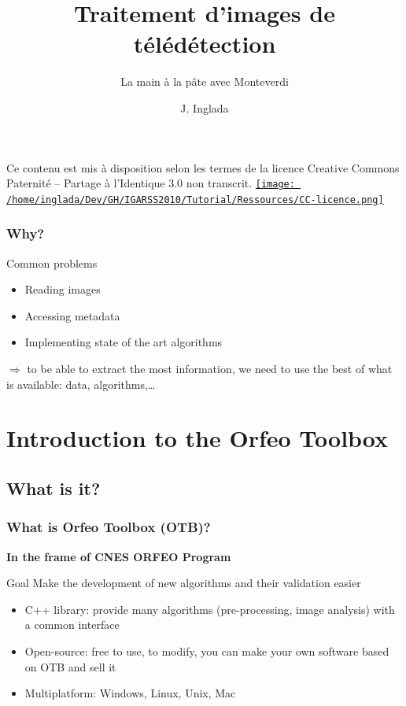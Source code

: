 \documentclass[compress]{beamer}
\title{Traitement d'images de télédétection}
\subtitle{La main à la pâte avec Monteverdi} %
\author
{J. Inglada}
\institute[Cesbio] %
{\textsc{Centre d'Études Spatiales de la Biosphère, Toulouse, France}}
\date{}
\begin{document}
\begin{frame}
  \titlepage
{\tiny Ce contenu est mis à disposition selon les termes de la licence
Creative Commons Paternité – Partage à l’Identique 3.0 non transcrit.} \href{http://creativecommons.org/licenses/by-sa/3.0/}{\texttt{[image: /home/inglada/Dev/GH/IGARSS2010/Tutorial/Ressources/CC-licence.png]}}
\end{frame}

\begin{frame}
\frametitle{Why?}
\begin{block}{Common problems}
\begin{itemize}
 \item Reading images
 \item Accessing metadata
 \item Implementing state of the art algorithms
\end{itemize}
\end{block}
$\Rightarrow$ to be able to \alert{extract the most information}, we
 need to \alert{use the best} of what is available: data, algorithms,\ldots
\end{frame}


\section{Introduction to the Orfeo Toolbox}



\subsection[What]{What is it?}
\begin{frame}
\frametitle{What is Orfeo Toolbox (OTB)?}

\textbf{In the frame of CNES ORFEO Program}
\begin{alertblock}{Goal}
Make the development of new algorithms and their validation easier
\end{alertblock}
\begin{block}{}
\begin{itemize}
 \item C++ library: provide many algorithms (pre-processing, image analysis) with a common interface
 \item Open-source: free to use, to modify, you can make your own software based on OTB and sell it
 \item Multiplatform: Windows, Linux, Unix, Mac
\end{itemize}
\end{block}
\end{frame}
\end{document}
